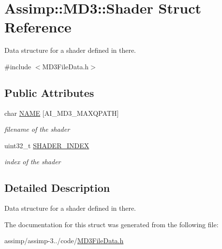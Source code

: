 \hypertarget{struct_assimp_1_1_m_d3_1_1_shader}{\section{Assimp\+:\+:M\+D3\+:\+:Shader Struct Reference}
\label{struct_assimp_1_1_m_d3_1_1_shader}
}


Data structure for a shader defined in there.  




{\ttfamily \#include $<$M\+D3\+File\+Data.\+h$>$}

\subsection*{Public Attributes}
\begin{DoxyCompactItemize}
\item 
\hypertarget{struct_assimp_1_1_m_d3_1_1_shader_ac790c19572363a419bc3cc247d8a858c}{char \hyperlink{struct_assimp_1_1_m_d3_1_1_shader_ac790c19572363a419bc3cc247d8a858c}{N\+A\+M\+E} \mbox{[}A\+I\+\_\+\+M\+D3\+\_\+\+M\+A\+X\+Q\+P\+A\+T\+H\mbox{]}}\label{struct_assimp_1_1_m_d3_1_1_shader_ac790c19572363a419bc3cc247d8a858c}

\begin{DoxyCompactList}\small\item\em filename of the shader \end{DoxyCompactList}\item 
\hypertarget{struct_assimp_1_1_m_d3_1_1_shader_a832986078fee9b6c73da4116a5eb2174}{uint32\+\_\+t \hyperlink{struct_assimp_1_1_m_d3_1_1_shader_a832986078fee9b6c73da4116a5eb2174}{S\+H\+A\+D\+E\+R\+\_\+\+I\+N\+D\+E\+X}}\label{struct_assimp_1_1_m_d3_1_1_shader_a832986078fee9b6c73da4116a5eb2174}

\begin{DoxyCompactList}\small\item\em index of the shader \end{DoxyCompactList}\end{DoxyCompactItemize}


\subsection{Detailed Description}
Data structure for a shader defined in there. 

The documentation for this struct was generated from the following file\+:\begin{DoxyCompactItemize}
\item 
assimp/assimp-\/3../code/\hyperlink{_m_d3_file_data_8h}{M\+D3\+File\+Data.\+h}\end{DoxyCompactItemize}
